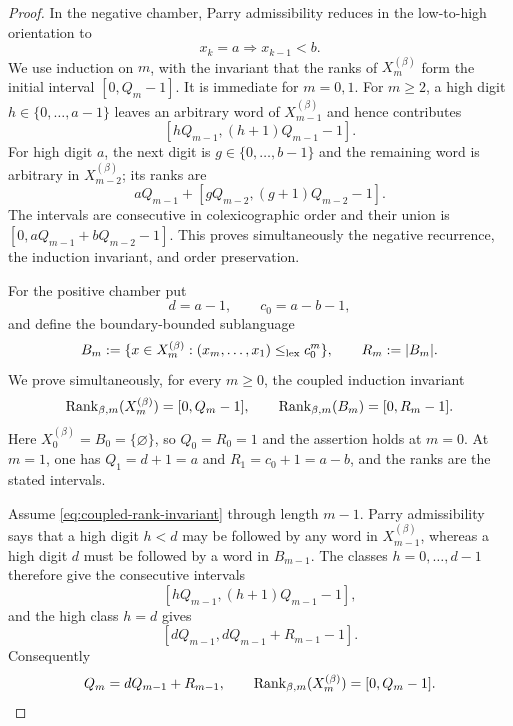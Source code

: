 \begin{proof}
In the negative chamber, Parry admissibility reduces in the low-to-high
orientation to
\[
x_k=a\Longrightarrow x_{k-1}<b.
\]
We use induction on $m$, with the invariant that the ranks of $X_m^{(\beta)}$
form the initial interval $[0,Q_m-1]$.  It is immediate for $m=0,1$.  For
$m\ge2$, a high digit $h\in\{0,\ldots,a-1\}$ leaves an arbitrary word of
$X_{m-1}^{(\beta)}$ and hence contributes
\[
[hQ_{m-1},(h+1)Q_{m-1}-1].
\]
For high digit $a$, the next digit is
$g\in\{0,\ldots,b-1\}$ and the remaining word is arbitrary in
$X_{m-2}^{(\beta)}$; its ranks are
\[
aQ_{m-1}+[gQ_{m-2},(g+1)Q_{m-2}-1].
\]
The intervals are consecutive in colexicographic order and their union is
$[0,aQ_{m-1}+bQ_{m-2}-1]$.  This proves simultaneously the negative
recurrence, the induction invariant, and order preservation.

For the positive chamber put
\[
d=a-1,\qquad c_0=a-b-1,
\]
and define the boundary-bounded sublanguage
\[
B_m:=\{x\in X_m^{(\beta)}:
(x_m,\ldots,x_1)\le_{\rm lex}c_0^m\},
\qquad R_m:=|B_m|.
\]
We prove simultaneously, for every $m\ge0$, the coupled induction invariant
\begin{equation}
\operatorname{Rank}_{\beta,m}(X_m^{(\beta)})=[0,Q_m-1],
\qquad
\operatorname{Rank}_{\beta,m}(B_m)=[0,R_m-1].
\label{eq:coupled-rank-invariant}
\end{equation}
Here $X_0^{(\beta)}=B_0=\{\varnothing\}$, so $Q_0=R_0=1$ and the assertion
holds at $m=0$.  At $m=1$, one has $Q_1=d+1=a$ and
$R_1=c_0+1=a-b$, and the ranks are the stated intervals.

Assume \eqref{eq:coupled-rank-invariant} through length $m-1$.  Parry
admissibility says that a high digit $h<d$ may be followed by any word in
$X_{m-1}^{(\beta)}$, whereas a high digit $d$ must be followed by a word in
$B_{m-1}$.  The classes $h=0,\ldots,d-1$ therefore give the consecutive
intervals
\[
[hQ_{m-1},(h+1)Q_{m-1}-1],
\]
and the high class $h=d$ gives
\[
[dQ_{m-1},dQ_{m-1}+R_{m-1}-1].
\]
Consequently
\begin{equation}
Q_m=dQ_{m-1}+R_{m-1},
\qquad
\operatorname{Rank}_{\beta,m}(X_m^{(\beta)})=[0,Q_m-1].
\label{eq:positive-X-coupling}
\end{equation}


\end{proof}
